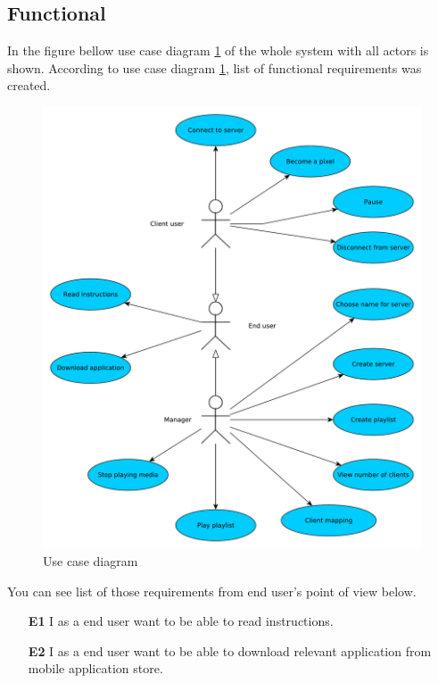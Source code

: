 \subsection{Functional}
In the figure bellow use case diagram \ref{img:usecase} of the whole system with all actors is shown.
According to use case diagram \ref{img:usecase}, list of functional requirements was created.

\begin{figure}[h!]
    \begin{center}
    \includegraphics[scale=0.4]{images/usecase.pdf}
    \caption{Use case diagram}
    \label{img:usecase}
    \end{center}
\end{figure}

You can see list of those requirements from end user's point of view below.

\begin{enumerate}
	\item[\textbf{E1}] \label{req_E1}
		I as a end user want to be able to read instructions.
	\item[\textbf{E2}] \label{req_E2}
		I as a end user want to be able to download relevant application from mobile application store.
\end{enumerate}

